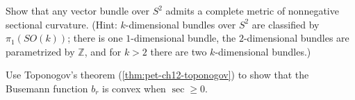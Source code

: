 \begin{remark}
  \label{rem:pet-ch12-ex-12-8-8}

  Show that any vector bundle over $S^2$ admits a complete metric of
  nonnegative sectional curvature. (Hint: $k$-dimensional bundles over $S^2$
  are classified by $\pi_1(SO(k))$; there is one $1$-dimensional bundle, the
  $2$-dimensional bundles are parametrized by $\mathbb{Z}$, and for $k>2$ there
  are two $k$-dimensional bundles.)
\end{remark}

\begin{remark}
  \label{rem:pet-ch12-ex-12-8-9}

  Use Toponogov's theorem (\cref{thm:pet-ch12-toponogov}) to show that the
  Busemann function $b_r$ is convex when $\sec\ge0$.
\end{remark}
